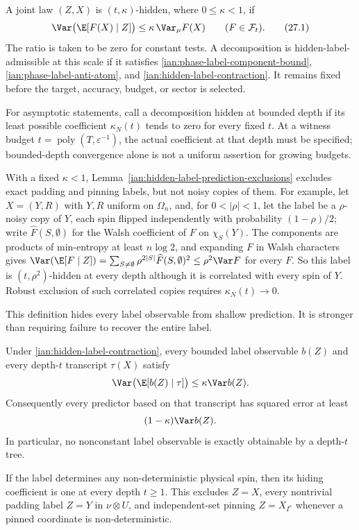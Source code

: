 \begin{definition}
\label{ian:hidden-label-no-disclosure}
A joint law \((Z,X)\) is \((t,\kappa)\)-hidden, where \(0\le\kappa<1\), if
\[
 \Var\bigl(\E[F(X)\mid Z]\bigr)
 \le\kappa\,\Var_\mu F(X)
 \qquad(F\in\mathcal F_t).
 \tag{27.1}\label{ian:hidden-label-contraction}
\]
The ratio is taken to be zero for constant tests. A decomposition is hidden-label-admissible at this scale if it satisfies
\eqref{ian:phase-label-component-bound},
\eqref{ian:phase-label-anti-atom}, and
\eqref{ian:hidden-label-contraction}. It remains fixed before the target, accuracy, budget, or sector is selected.

For asymptotic statements, call a decomposition hidden at bounded depth if its least possible coefficient \(\kappa_N(t)\) tends to zero for every fixed \(t\). At a witness budget \(t=\operatorname{poly}(T,\varepsilon^{-1})\), the actual coefficient at that depth must be specified; bounded-depth convergence alone is not a uniform assertion for growing budgets.

With a fixed \(\kappa<1\), Lemma~\ref{ian:hidden-label-prediction-exclusions} excludes exact padding and pinning labels, but not noisy copies of them. For example, let \(X=(Y,R)\) with \(Y,R\) uniform on \(\Omega_n\), and, for \(0<|\rho|<1\), let the label be a \(\rho\)-noisy copy of \(Y\), each spin flipped independently with probability \((1-\rho)/2\); write \(\widehat F(S,\emptyset)\) for the Walsh coefficient of \(F\) on \(\chi_S(Y)\). The components are products of min-entropy at least \(n\log2\), and expanding \(F\) in Walsh characters gives
\(\Var(\E[F\mid Z])=\sum_{S\ne\emptyset}\rho^{2|S|}\widehat F(S,\emptyset)^2\le\rho^2\Var F\) for every \(F\). So this label is \((t,\rho^2)\)-hidden at every depth although it is correlated with every spin of \(Y\). Robust exclusion of such correlated copies requires \(\kappa_N(t)\to0\).

This definition hides every label observable from shallow prediction. It is stronger than requiring failure to recover the entire label.
\end{definition}

\begin{lemma}
\label{ian:hidden-label-prediction-exclusions}
Under \eqref{ian:hidden-label-contraction}, every bounded label observable \(b(Z)\) and every depth-\(t\) transcript \(\tau(X)\) satisfy
\[
 \Var\bigl(\E[b(Z)\mid\tau]\bigr)\le\kappa\Var b(Z).
\]
Consequently every predictor based on that transcript has squared error at least
\[
 (1-\kappa)\Var b(Z).
\]
In particular, no nonconstant label observable is exactly obtainable by a depth-\(t\) tree.

If the label determines any non-deterministic physical spin, then its hiding coefficient is one at every depth \(t\ge1\). This excludes \(Z=X\), every nontrivial padding label \(Z=Y\) in
\(\nu\otimes U\), and independent-set pinning \(Z=X_{I^c}\) whenever a pinned coordinate is non-deterministic.
\end{lemma}


